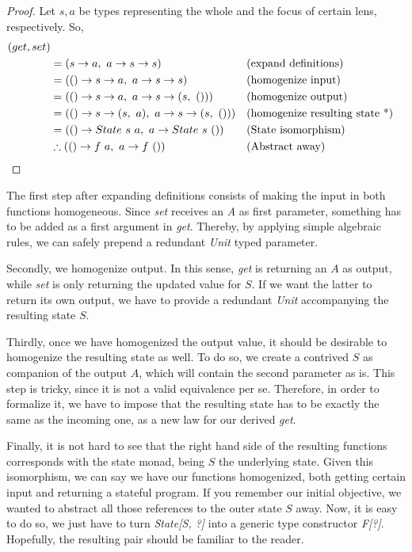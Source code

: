\documentclass[a4paper]{article}
\begin{document}
\begin{proof}
  Let $s, a$ be types representing the whole and the focus of certain lens,
  respectively. So,
  \begin{align*}
    (get, set) \\
    &= (s \rightarrow a,\ a \rightarrow s \rightarrow s) &&\text{(expand definitions)} \\
    &= (() \rightarrow s \rightarrow a,\ a \rightarrow s \rightarrow s) &&\text{(homogenize input)} \\
    &= (() \rightarrow s \rightarrow a,\ a \rightarrow s \rightarrow (s,\ ())) &&\text{(homogenize output)} \\
    &= (() \rightarrow s \rightarrow (s,\ a),\ a \rightarrow s \rightarrow (s,\ ())) &&\text{(homogenize resulting state *)} \\
    &= (() \rightarrow State\ s\ a,\ a \rightarrow State\ s\ ()) &&\text{(State isomorphism)} \\
    &\therefore (() \rightarrow f\ a,\ a \rightarrow f\ ()) &&\text{(Abstract away)}\qedhere
  \end{align*}
\end{proof}

The first step after expanding definitions consists of making the input in both
functions homogeneous. Since \emph{set} receives an \emph{A} as first parameter,
something has to be added as a first argument in \emph{get}. Thereby, by
applying simple algebraic rules, we can safely prepend a redundant \emph{Unit}
typed parameter.

Secondly, we homogenize output. In this sense, \emph{get} is returning an $A$ as
output, while \emph{set} is only returning the updated value for $S$. If we want
the latter to return its own output, we have to provide a redundant \emph{Unit}
accompanying the resulting state $S$.

Thirdly, once we have homogenized the output value, it should be desirable to
homogenize the resulting state as well. To do so, we create a contrived $S$ as
companion of the output $A$, which will contain the second parameter as is. This
step is tricky, since it is not a valid equivalence per se. Therefore, in order
to formalize it, we have to impose that the resulting state has to be exactly
the same as the incoming one, as a new law for our derived
\emph{get}.

Finally, it is not hard to see that the right hand side of the resulting
functions corresponds with the state monad, being $S$ the underlying state.
Given this isomorphism, we can say we have our functions homogenized, both
getting certain input and returning a stateful program. If you remember our
initial objective, we wanted to abstract all those references to the outer state
$S$ away. Now, it is easy to do so, we just have to turn \emph{State[S, ?]} into
a generic type constructor \emph{F[?]}. Hopefully, the resulting pair should be
familiar to the reader.
\end{document}
